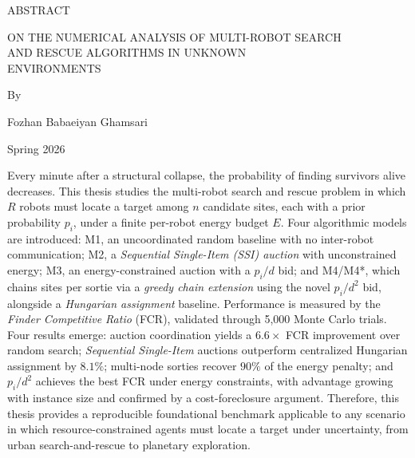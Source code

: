 \clearpage
{}
{}
\begin{center}
ABSTRACT

\vspace{0.25in}
ON THE NUMERICAL ANALYSIS OF MULTI-ROBOT SEARCH\\
AND RESCUE ALGORITHMS IN UNKNOWN\\
ENVIRONMENTS

\vspace{0.25in}
By

\vspace{0.1in}
Fozhan Babaeiyan Ghamsari

\vspace{0.1in}
Spring 2026
\end{center}

\begin{doublespacing}
\noindent
Every minute after a structural collapse, the probability of finding
survivors alive decreases.
This thesis studies the multi-robot search and rescue problem in which
$R$ robots must locate a target among $n$ candidate sites, each with a
prior probability $p_i$, under a finite per-robot energy budget $E$.
Four algorithmic models are introduced: M1, an uncoordinated random
baseline with no inter-robot communication; M2, a
\emph{Sequential Single-Item (SSI) auction} with unconstrained energy;
M3, an energy-constrained auction with a $p_i/d$ bid; and M4/M4*,
which chains sites per sortie via a \emph{greedy chain extension} using
the novel $p_i/d^2$ bid, alongside a \emph{Hungarian assignment}
baseline.
Performance is measured by the \emph{Finder Competitive Ratio} (FCR),
validated through 5,000 Monte Carlo trials.
Four results emerge: auction coordination yields a $6.6\times$ FCR
improvement over random search; \emph{Sequential Single-Item} auctions
outperform centralized Hungarian assignment by $8.1\%$; multi-node
sorties recover $90\%$ of the energy penalty; and $p_i/d^2$ achieves
the best FCR under energy constraints, with advantage growing with
instance size and confirmed by a cost-foreclosure argument.
Therefore, this thesis provides a reproducible foundational benchmark
applicable to any scenario in which resource-constrained agents must
locate a target under uncertainty, from urban search-and-rescue to
planetary exploration.
\end{doublespacing}
\clearpage
